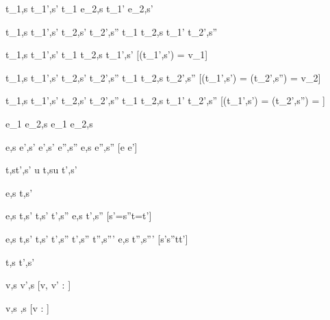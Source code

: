   {t_1,s \stride t_1',s'}
  {t_1 \Next e_2,s \stride t_1' \Next e_2,s'}


  {t_1,s  \stride t_1',s'  \Quad
   t_2,s' \stride t_2',s''}
  {t_1 \And t_2,s \stride t_1' \And t_2',s''}


  {t_1,s  \stride t_1',s'}
  {t_1 \Or t_2,s \stride t_1',s'}
  [\Value(t_1',s') = v_1]

  {t_1,s  \stride t_1',s'  \Quad
   t_2,s' \stride t_2',s''}
  {t_1 \Or t_2,s \stride t_2',s''}
  [\Value(t_1',s') = \bot \land \Value(t_2',s'') = v_2]

  {t_1,s  \stride t_1',s'  \Quad
   t_2,s' \stride t_2',s''}
  {t_1 \Or t_2,s \stride t_1' \Or t_2',s''}
  [\Value(t_1',s') = \bot \land \Value(t_2',s'') = \bot]


  { }
  {e_1 \Xor e_2,s \stride e_1 \Xor e_2,s}

    {e,s \evaluate e',s'  \Quad
     e',s' \stride e'',s''}
    {e,s \stride e'',s''}
    [e \neq e']


  {t,s\stride t',s'}
  {u \At t,s\stride u \At t',s'}









  {e,s \normalise t,s'}


    {e,s \evaluate t,s'  \Quad
     t,s' \stride t',s''}
    {e,s \normalise t',s''}
    [s'=s''\wedge t=t']

    {e,s \evaluate t,s'  \Quad
     t,s' \stride t',s''  \Quad
     t',s'' \normalise t'',s'''}
    {e,s \normalise t'',s'''}
    [s'\neq s''\vee t\neq t']





  {t,s  t',s'}

  { }
  {\Edit v,s  \Edit v',s}
  [v, v' : \tau]

  { }
  {\Edit v,s \handle{\Empty} \Enter \tau,s}
  [v : \tau]

